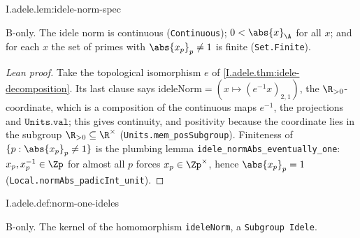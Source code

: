 \begin{lemma}
\bonly
{}
\end{lemma}
\begin{tfformal}{I.adele.lem:idele-norm-spec}
\begin{tffidelity}
B-only. The idele norm is continuous (\texttt{Continuous}); $0<\abs{x}_\A$ for all $x$; and for each $x$ the set of primes with $\abs{x_p}_p\neq1$ is finite (\texttt{Set.Finite}).
\end{tffidelity}
\end{tfformal}
\begin{proof}[Lean proof]
Take the topological isomorphism $e$ of \cref{I.adele.thm:idele-decomposition}. Its last clause says $\mathrm{ideleNorm}=(x\mapsto (e^{-1}x)_{2,1})$, the $\R_{>0}$-coordinate, which is a composition of the continuous maps $e^{-1}$, the projections and $\texttt{Units.val}$; this gives continuity, and positivity because the coordinate lies in the subgroup $\R_{>0}\subseteq\R^\times$ (\texttt{Units.mem\_posSubgroup}). Finiteness of $\{p:\abs{x_p}_p\ne1\}$ is the plumbing lemma \texttt{idele\_normAbs\_eventually\_one}: $x_p,x_p^{-1}\in\Zp$ for almost all $p$ forces $x_p\in\Zp^\times$, hence $\abs{x_p}_p=1$ (\texttt{Local.normAbs\_padicInt\_unit}).
\end{proof}

\begin{definition}
\bonly
{}
\end{definition}
\begin{tfformal}{I.adele.def:norm-one-ideles}
\begin{tffidelity}
B-only. The kernel of the homomorphism \texttt{ideleNorm}, a \texttt{Subgroup Idele}.
\end{tffidelity}
\end{tfformal}

